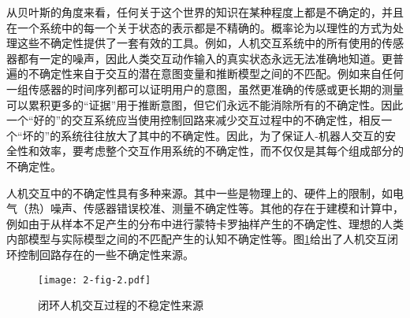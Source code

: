 从贝叶斯的角度来看，任何关于这个世界的知识在某种程度上都是不确定的，并且在一个系统中的每一个关于状态的表示都是不精确的。概率论为以理性的方式为处理这些不确定性提供了一套有效的工具。例如，人机交互系统中的所有使用的传感器都有一定的噪声，因此人类交互动作输入的真实状态永远无法准确地知道。更普遍的不确定性来自于交互的潜在意图变量和推断模型之间的不匹配。例如来自任何一组传感器的时间序列都可以证明用户的意图，虽然更准确的传感或更长期的测量可以累积更多的``证据''用于推断意图，但它们永远不能消除所有的不确定性。因此一个``好的''的交互系统应当使用控制回路来减少交互过程中的不确定性，相反一个``坏的''的系统往往放大了其中的不确定性。因此，为了保证人-机器人交互的安全性和效率，要考虑整个交互作用系统的不确定性，而不仅仅是其每个组成部分的不确定性。

人机交互中的不确定性具有多种来源。其中一些是物理上的、硬件上的限制，如电气（热）噪声、传感器错误校准、测量不确定性等。其他的存在于建模和计算中，例如由于从样本不足产生的分布中进行蒙特卡罗抽样产生的不确定性、理想的人类内部模型与实际模型之间的不匹配产生的认知不确定性等。图\ref{fig:2-2}给出了人机交互闭环控制回路存在的一些不确定性来源。

\begin{figure}[h]
    \centering
    \texttt{[image: 2-fig-2.pdf]}
    \caption{闭环人机交互过程的不稳定性来源}
    \label{fig:2-2}
\end{figure}


